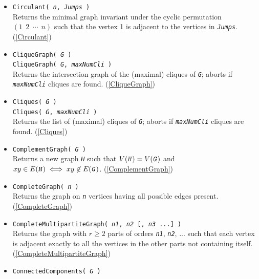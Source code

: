 \documentclass[a4paper,11pt]{report}
\begin{document}
{{\begin{itemize}
\item \texttt{Circulant( \mbox{\texttt{\mdseries\slshape n}}, \mbox{\texttt{\mdseries\slshape Jumps}} )}\\
 Returns the minimal graph invariant under the cyclic permutation $(1\;\,2\;\,\cdots\;\,n)$ such that the vertex 1 is adjacent to the vertices in \mbox{\texttt{\mdseries\slshape Jumps}}. (\ref{Circulant}) 
\item \texttt{CliqueGraph( \mbox{\texttt{\mdseries\slshape G}} )}\\
 \texttt{CliqueGraph( \mbox{\texttt{\mdseries\slshape G}}, \mbox{\texttt{\mdseries\slshape maxNumCli}} )}\\
 Returns the intersection graph of the (maximal) cliques of \mbox{\texttt{\mdseries\slshape G}}; aborts if \mbox{\texttt{\mdseries\slshape maxNumCli}} cliques are found. (\ref{CliqueGraph}) 
\item \texttt{Cliques( \mbox{\texttt{\mdseries\slshape G}} )}\\
 \texttt{Cliques( \mbox{\texttt{\mdseries\slshape G}}, \mbox{\texttt{\mdseries\slshape maxNumCli}} )}\\
 Returns the list of (maximal) cliques of \mbox{\texttt{\mdseries\slshape G}}; aborts if \mbox{\texttt{\mdseries\slshape maxNumCli}} cliques are found. (\ref{Cliques}) 
\item \texttt{ComplementGraph( \mbox{\texttt{\mdseries\slshape G}} )}\\
 Returns a new graph \mbox{\texttt{\mdseries\slshape H}} such that $V(\mbox{\texttt{\mdseries\slshape H}})=V(\mbox{\texttt{\mdseries\slshape G}})$ and $xy\in E(\mbox{\texttt{\mdseries\slshape H}}) \iff xy \not\in E(\mbox{\texttt{\mdseries\slshape G}})$. (\ref{ComplementGraph}) 
\item \texttt{CompleteGraph( \mbox{\texttt{\mdseries\slshape n}} )}\\
 Returns the graph on \mbox{\texttt{\mdseries\slshape n}} vertices having all possible edges present. (\ref{CompleteGraph}) 
\item \texttt{CompleteMultipartiteGraph( \mbox{\texttt{\mdseries\slshape n1}}, \mbox{\texttt{\mdseries\slshape n2}} [, \mbox{\texttt{\mdseries\slshape n3}} ...] )}\\
 Returns the graph with $r\geq 2$ parts of orders \mbox{\texttt{\mdseries\slshape n1}}, \mbox{\texttt{\mdseries\slshape n2}}, ... such that each vertex is adjacent exactly to all the vertices in the
other parts not containing itself. (\ref{CompleteMultipartiteGraph}) 
\item \texttt{ConnectedComponents( \mbox{\texttt{\mdseries\slshape G}} )}\\

\end{itemize}}}
\end{document}
